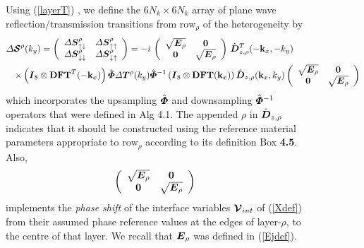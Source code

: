 \begin{figure}
{\begin{minipage} {140.0mm}
 Using (\ref{layerT}) , we define
the $6 N_k \times 6 N_k$ array of plane wave reflection/transmission 
transitions from $\mbox{row}_{\rho}$ of the heterogeneity by
\begin{eqnarray} \label{laySdef}
\lefteqn{
{\mit \Delta}{\CB S}^{\rho}(k_y)=
\left({\begin{array}{cc}
{\mit \Delta}{\bmi S}_{\uparrow \downarrow }^{\rho}&{\mit \Delta}{\bmi S}_{ \uparrow \uparrow }^{\rho}\\ 
{\mit \Delta}{\bmi S}_{\downarrow \downarrow }^{\rho}&{\mit \Delta}{\bmi S}_{ \downarrow \uparrow}^{\rho}
\end{array}}\right)=
-i\,\left({\begin{array}{cc}
\sqrt{{\bmi E}_{\rho}}&{\bf 0}\\ 
{\bf 0}&\sqrt{{\bmi E}_{\rho}}
\end{array}}\right)\,
\hat{\bmi  D}{}^{T}_{z,\rho}(-{\bf k}_{x},-{k}_{y})}\\
&&
\times 
\left({\bmi I}_8\otimes{\bf DFT}^{T}(-{\bf k}_{x})  \right)
\hat{\bmi \Phi}{\mit \Delta}{\bmi T}{}^{\rho}(k_y) 
\hat{\bmi \Phi}{}^{-1} \left({\bmi I}_8\otimes 
{\bf DFT}({\bf k}_{x}) \right)\hat{\bmi  D}_{z,\rho}({\bf k}_{x},{k}_{y}) \left({\begin{array}{cc}
\sqrt{{\bmi E}_{\rho}}&{\bf 0}\\ 
{\bf 0}&\sqrt{{\bmi E}_{\rho}}
\end{array}}\right)\nonumber
\end{eqnarray}
which incorporates the upsampling $\hat{\mbox{\boldmath$\mit \Phi$\unboldmath}}$ and downsampling $\hat{\mbox{\boldmath$\mit \Phi$\unboldmath}}{}^{-1}$ 
operators that were defined in Alg 4.1.
The appended $\rho$ in $\hat{\mbox{\boldmath$\mit D$\unboldmath}}_{z,\rho}$ indicates that it should 
be constructed using the reference material parameters appropriate to 
$\mbox{row}_{\rho}$ according to its definition {\sc Box } {\bf 4.5}.
Also, 
\[
\left({\begin{array}{cc}
\sqrt{{\mbox{\boldmath$\mit E$\unboldmath}}_{\rho}}&{\bf 0}\\ 
{\bf 0}&\sqrt{{\mbox{\boldmath$\mit E$\unboldmath}}_{\rho}}
\end{array}}\right)
\]
implements the  {\em phase shift\/} of the interface variables ${\mbox{\boldmath$\cal V$\unboldmath}}_{{int}}$ of (\ref{Xdef})  from their 
assumed phase reference values at the edges of layer-$\rho$,
 to the centre of that 
layer. We recall that ${\mbox{\boldmath$\mit E$\unboldmath}}_{\rho}$ was defined in (\ref{Ejdef}).




\end{minipage}}
\end{figure}
